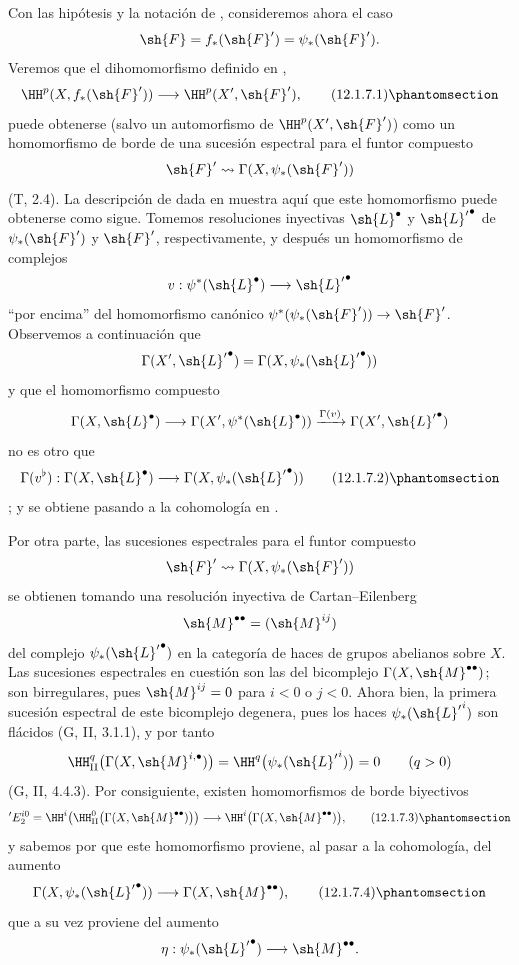 \documentclass[oneside]{amsart}
\makeatletter
\newcommand{\ega@arrow}[2]{\mathchoice{#1}{#2}{#2}{#2}}
\renewcommand{\to}{\ega@arrow{\longrightarrow}{\rightarrow}}
\newcommand{\oldpage}[2][]{{\marginnote{\normalfont\textbf{#1}~|~#2}}\ignorespaces}
\let\EGAOriginalLabel\label
\renewcommand{\label}[1]{\phantomsection\EGAOriginalLabel{#1}}
\makeatother
\begin{document}
\begin{env}[12.1.7]
\label{0.12.1.7}
Con las hipótesis y la notación de , consideremos ahora el
caso
\[
  \sh{F}=f_*(\sh{F}')=\psi_*(\sh{F}').
\]
Veremos que el dihomomorfismo definido en ,
\[
  \HH^p(X,f_*(\sh{F}'))\longrightarrow\HH^p(X',\sh{F}'),
  \tag{12.1.7.1}
  \label{0.12.1.7.1}
\]
puede obtenerse (salvo un automorfismo de $\HH^p(X',\sh{F}')$) como un
homomorfismo de borde de una sucesión espectral para el funtor compuesto
\[
  \sh{F}'\leadsto\Gamma(X,\psi_*(\sh{F}'))
\]
(T, 2.4).
La descripción de  dada en  muestra
aquí que este homomorfismo puede obtenerse como sigue.
Tomemos resoluciones inyectivas $\sh{L}^\bullet$ y
${\sh{L}'}^\bullet$ de $\psi_*(\sh{F}')$ y $\sh{F}'$,
respectivamente, y después un homomorfismo de complejos
\[
  v:\psi^*(\sh{L}^\bullet)\longrightarrow{\sh{L}'}^\bullet
\]
``por encima'' del homomorfismo canónico
$\psi^*(\psi_*(\sh{F}'))\to\sh{F}'$.
\oldpage[0\textsubscript{III}]{56}
Observemos a continuación que
\[
  \Gamma(X',{\sh{L}'}^\bullet)
  =\Gamma(X,\psi_*({\sh{L}'}^\bullet))
\]
y que el homomorfismo compuesto
\[
  \Gamma(X,\sh{L}^\bullet)
  \longrightarrow\Gamma(X',\psi^*(\sh{L}^\bullet))
  \xrightarrow{\Gamma(v)}\Gamma(X',{\sh{L}'}^\bullet)
\]
no es otro que
\[
  \Gamma(v^\flat):
  \Gamma(X,\sh{L}^\bullet)
  \longrightarrow\Gamma(X,\psi_*({\sh{L}'}^\bullet))
  \tag{12.1.7.2}
  \label{0.12.1.7.2}
\]
; y  se
obtiene pasando a la cohomología en .

Por otra parte, las sucesiones espectrales para el funtor compuesto
\[
  \sh{F}'\leadsto\Gamma(X,\psi_*(\sh{F}'))
\]
se obtienen tomando una resolución inyectiva de Cartan--Eilenberg
\[
  \sh{M}^{\bullet\bullet}=(\sh{M}^{ij})
\]
del complejo $\psi_*({\sh{L}'}^\bullet)$ en la categoría de
haces de grupos abelianos sobre $X$.
Las sucesiones espectrales en cuestión son las del bicomplejo
$\Gamma(X,\sh{M}^{\bullet\bullet})$; son birregulares, pues
$\sh{M}^{ij}=0$ para $i<0$ o $j<0$.
Ahora bien, la primera sucesión espectral de este bicomplejo degenera, pues
los haces $\psi_*({\sh{L}'}^i)$ son flácidos (G, II, 3.1.1), y
por tanto
\[
  \HH_\mathrm{II}^q
    \bigl(\Gamma(X,\sh{M}^{i,\bullet})\bigr)
  =\HH^q\bigl(\psi_*({\sh{L}'}^i)\bigr)=0
  \qquad(q>0)
\]
(G, II, 4.4.3).
Por consiguiente, existen homomorfismos de borde biyectivos
\[
  {}'E_2^{i0}
  =\HH^i\!\left(
      \HH_\mathrm{II}^0
        \bigl(\Gamma(X,\sh{M}^{\bullet\bullet})\bigr)
    \right)
  \longrightarrow
  \HH^i\bigl(\Gamma(X,\sh{M}^{\bullet\bullet})\bigr),
  \tag{12.1.7.3}
  \label{0.12.1.7.3}
\]
y sabemos por  que este homomorfismo proviene, al pasar
a la cohomología, del aumento
\[
  \Gamma(X,\psi_*({\sh{L}'}^\bullet))
  \longrightarrow\Gamma(X,\sh{M}^{\bullet\bullet}),
  \tag{12.1.7.4}
  \label{0.12.1.7.4}
\]
que a su vez proviene del aumento
\[
  \eta:\psi_*({\sh{L}'}^\bullet)
  \longrightarrow\sh{M}^{\bullet\bullet}.
\]


\end{env}
\end{document}
